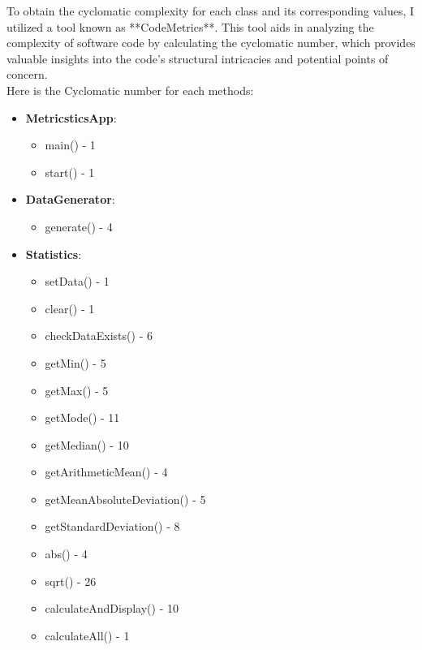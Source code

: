 \documentclass[12pt,letterpaper]{report}
\begin{document}
 To obtain the cyclomatic complexity for each class and its corresponding values, I utilized a tool known as **CodeMetrics**. This tool aids in analyzing the complexity of software code by calculating the cyclomatic number, which provides valuable insights into the code's structural intricacies and potential points of concern.\\

 Here is the Cyclomatic number for each methods: \\
 
 \begin{itemize}
 \item \textbf{MetricsticsApp}:
    \begin{itemize}
        \item main() - 1
        \item start() - 1
    \end{itemize}
 \end{itemize}

 \begin{itemize}
 \item \textbf{DataGenerator}: 
    \begin{itemize}
        \item generate() - 4
    \end{itemize}
 \end{itemize}

 \begin{itemize}
 \item \textbf{Statistics}: 
    \begin{itemize}
        \item setData() - 1
        \item clear() - 1
        \item checkDataExists() - 6
        \item getMin() - 5
        \item getMax() - 5
        \item getMode() - 11
        \item getMedian() - 10
        \item getArithmeticMean() - 4
        \item getMeanAbsoluteDeviation() - 5
        \item getStandardDeviation() - 8
        \item abs() - 4
        \item sqrt() - 26
        \item calculateAndDisplay() - 10
        \item calculateAll() - 1
    \end{itemize}
 \end{itemize}
\end{document}
